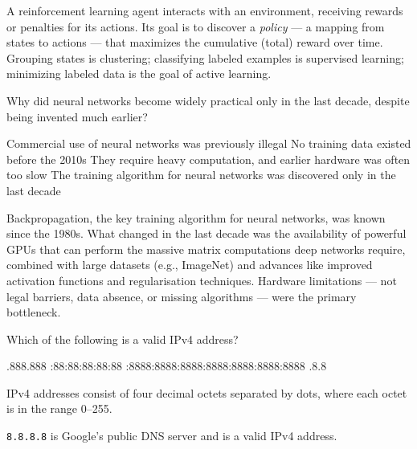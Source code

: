 \documentclass[answers]{exam}
\begin{document}
\begin{questions}
\begin{solution}
    A reinforcement learning agent interacts with an environment, receiving rewards or penalties for its actions.
    Its goal is to discover a \textit{policy} --- a mapping from states to actions --- that maximizes the cumulative (total) reward over time.
    Grouping states is clustering; classifying labeled examples is supervised learning; minimizing labeled data is the goal of active learning.
\end{solution}

\question Why did neural networks become widely practical only in the last decade, despite being invented much earlier?

\begin{choices}
    \choice Commercial use of neural networks was previously illegal
    \choice No training data existed before the 2010s
    \correctchoice They require heavy computation, and earlier hardware was often too slow
    \choice The training algorithm for neural networks was discovered only in the last decade
\end{choices}

\begin{solution}
    Backpropagation, the key training algorithm for neural networks, was known since the 1980s.
    What changed in the last decade was the availability of powerful GPUs that can perform the massive matrix computations deep networks require, combined with large datasets (e.g., ImageNet) and advances like improved activation functions and regularisation techniques.
    Hardware limitations --- not legal barriers, data absence, or missing algorithms --- were the primary bottleneck.
\end{solution}

\question Which of the following is a valid IPv4 address?

\begin{choices}
    .888.888
    :88:88:88:88:88
    :8888:8888:8888:8888:8888:8888:8888
    .8.8
\end{choices}

\begin{solution}
    IPv4 addresses consist of four decimal octets separated by dots, where each octet is in the range 0--255.
    
    \texttt{8.8.8.8} is Google's public DNS server and is a valid IPv4 address.
    

\end{solution}
\end{questions}
\end{document}
